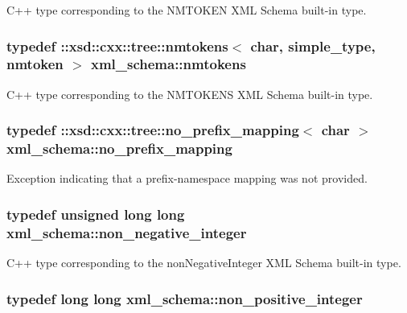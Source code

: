 C++ type corresponding to the N\-M\-T\-O\-K\-E\-N X\-M\-L Schema built-\/in type. 

\hypertarget{namespacexml__schema_af680cdfd739686fb9b689667435092f8}{
\subsubsection[{nmtokens}]{\setlength{\rightskip}{0pt plus 5cm}typedef \-::xsd\-::cxx\-::tree\-::nmtokens$<$ char, {\bf simple\-\_\-type}, {\bf nmtoken} $>$ {\bf xml\-\_\-schema\-::nmtokens}}}\label{namespacexml__schema_af680cdfd739686fb9b689667435092f8}


C++ type corresponding to the N\-M\-T\-O\-K\-E\-N\-S X\-M\-L Schema built-\/in type. 

\hypertarget{namespacexml__schema_a03293581f2c90a05fbb910be49380e01}{
\subsubsection[{no\-\_\-prefix\-\_\-mapping}]{\setlength{\rightskip}{0pt plus 5cm}typedef \-::xsd\-::cxx\-::tree\-::no\-\_\-prefix\-\_\-mapping$<$ char $>$ {\bf xml\-\_\-schema\-::no\-\_\-prefix\-\_\-mapping}}}\label{namespacexml__schema_a03293581f2c90a05fbb910be49380e01}


Exception indicating that a prefix-\/namespace mapping was not provided. 

\hypertarget{namespacexml__schema_af42ef5911d65f41a0a03598b056f05aa}{
\subsubsection[{non\-\_\-negative\-\_\-integer}]{\setlength{\rightskip}{0pt plus 5cm}typedef unsigned long long {\bf xml\-\_\-schema\-::non\-\_\-negative\-\_\-integer}}}\label{namespacexml__schema_af42ef5911d65f41a0a03598b056f05aa}


C++ type corresponding to the non\-Negative\-Integer X\-M\-L Schema built-\/in type. 

\hypertarget{namespacexml__schema_a3de6073e510eb8edd71ddc6e0256e2f9}{
\subsubsection[{non\-\_\-positive\-\_\-integer}]{\setlength{\rightskip}{0pt plus 5cm}typedef long long {\bf xml\-\_\-schema\-::non\-\_\-positive\-\_\-integer}}}\label{namespacexml__schema_a3de6073e510eb8edd71ddc6e0256e2f9}


